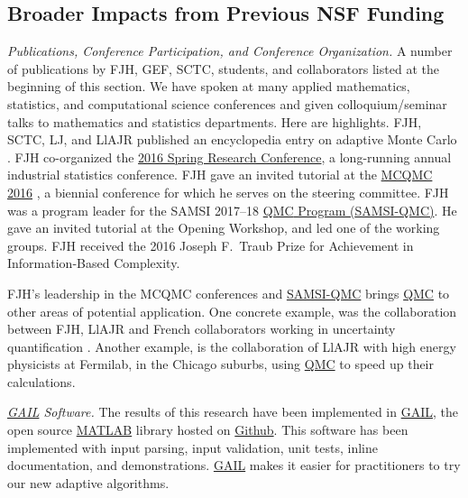 \documentclass[11pt]{NSFamsart}
\newcommand{\GAIL}{\hyperlink{GAILlink}{GAIL}\xspace}
\newcommand{\QMC}{\hyperlink{QMClink}{QMC}\xspace}
\newcommand{\SAMSIQMC}{\hyperlink{SAMSIlink}{SAMSI-QMC}\xspace}
\newcommand{\MATLAB}{\hyperlink{MATLABlink}{MATLAB}\xspace}
\newcommand{\Rlang}{\hyperlink{Rlink}{R}\xspace}
\begin{document}
\subsection{Broader Impacts from Previous NSF Funding} \label{prevBIsect}

\emph{Publications, Conference Participation, and Conference Organization.} A number of publications by FJH, GEF, SCTC, students, and collaborators listed at the beginning of this section.  We have spoken at many applied mathematics, statistics, 
and computational science conferences and given colloquium/seminar talks to mathematics and 
statistics departments.  Here are highlights.  FJH, SCTC, LJ, and LlAJR published  an 
encyclopedia entry on adaptive Monte Carlo \cite{HicEtal18a}.  FJH co-organized the 
\href{http://cos.iit.edu/2016-spring-research-conference/}{2016 Spring Research 
Conference}, a long-running annual industrial statistics conference.   FJH gave an invited tutorial 
at the \href{http://mcqmc2016.stanford.edu}{MCQMC 2016} 
\cite{Hic17a}, a biennial conference for which he serves on the steering committee.  FJH 
was a program leader for the SAMSI 2017--18 
\href{https://www.samsi.info/programs-and-activities/year-long-research-programs/2017-18-program-quasi-monte-carlo-high-dimensional-sampling-methods-applied-mathematics-qmc/
}{\QMC Program (\hypertarget{SAMSIlink}{SAMSI-QMC})}.   He  gave an invited tutorial 
	at the Opening Workshop, and led one of 
	the working groups.  FJH received the 2016 Joseph F.\ Traub 
	Prize for Achievement in Information-Based Complexity.
	
	
FJH's leadership in the MCQMC conferences  and \SAMSIQMC brings \QMC to other areas of potential application.  One concrete example, was the 
	collaboration between FJH, LlAJR and French collaborators working in uncertainty quantification \cite{GilEtal16a, GilJim16b}.  Another example, is the collaboration of LlAJR with
	high energy physicists at Fermilab, in the Chicago suburbs, using \QMC to speed 
	up their calculations.
	
\emph{\GAIL Software.} The results of this research have been implemented in 
\GAIL, the open source \MATLAB library hosted on
\href{http://gailgithub.github.io/GAIL_Dev/} {Github}. This software 
has been implemented with input parsing, input validation, unit tests, inline documentation, and 
demonstrations.  \GAIL makes it easier for practitioners to try our new adaptive algorithms.  
\end{document}
